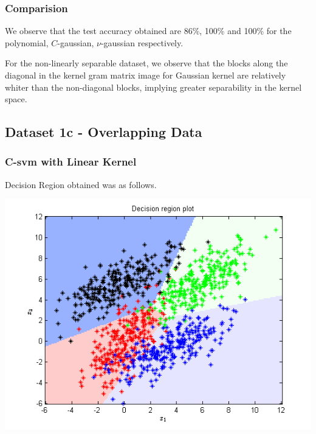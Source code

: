 \documentclass{article}
\begin{document}
\subsubsection{Comparision}
We observe that the test accuracy obtained are 86\%, 100\% and 100\% for the polynomial, $C$-gaussian, $\nu$-gaussian respectively.

For the non-linearly separable dataset, we observe that the blocks along the diagonal in the kernel gram matrix image for Gaussian kernel are relatively whiter than the non-diagonal blocks, implying greater separability in the kernel space.
\newpage

\subsection{Dataset 1c - Overlapping Data}



\subsubsection{C-svm with Linear Kernel}

Decision Region obtained was as follows.
\begin{center}
\includegraphics[scale=0.8]{Classification/1c/c_linear/dec}
\end{center}
\end{document}
